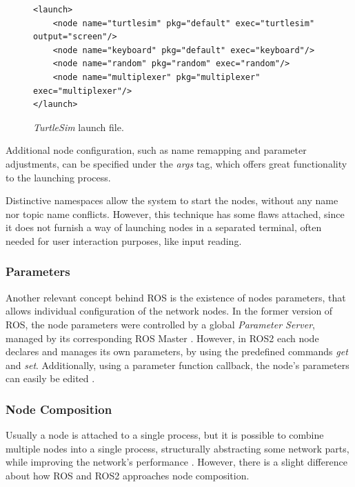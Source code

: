 \begin{figure}[H]
\begin{lstlisting}[otherkeywords={launch, node, name, pkg, exec, output}]
<launch>
    <node name="turtlesim" pkg="default" exec="turtlesim" output="screen"/>
    <node name="keyboard" pkg="default" exec="keyboard"/>
    <node name="random" pkg="random" exec="random"/>
    <node name="multiplexer" pkg="multiplexer" exec="multiplexer"/>
</launch>
\end{lstlisting}
\caption{\textit{TurtleSim} launch file.}
\label{fig:ros-lf}
\end{figure}

Additional node configuration, such as name remapping and parameter adjustments, can be specified under the \textit{args} tag, which offers great functionality to the launching process. 

Distinctive namespaces allow the system to start the nodes, without any name nor topic name conflicts. However, this technique has some flaws attached, since it does not furnish a way of launching nodes in a separated terminal, often needed for user interaction purposes, like input reading.

\subsubsection{Parameters}   

Another relevant concept behind ROS is the existence of nodes parameters, that allows individual configuration of the network nodes. In the former version of ROS, the node parameters were controlled by a global \textit{Parameter Server}, managed by its corresponding ROS Master \cite{intro-ros}. However, in ROS2 each node declares and manages its own parameters, by using the predefined commands \textit{get} and \textit{set}. Additionally, using a parameter function callback, the node's parameters can easily be edited \cite{ros2documentation}.
        
\subsubsection{Node Composition}  

Usually a node is attached to a single process, but it is possible to combine multiple nodes into a single process, structurally abstracting some network parts, while improving the network's performance \cite{ros2documentation}. However, there is a slight difference about how ROS and ROS2 approaches node composition. 

